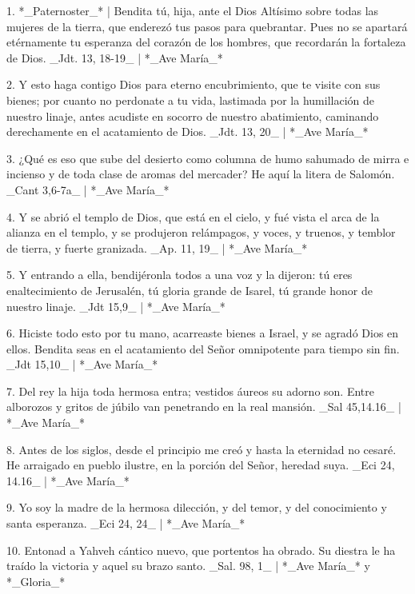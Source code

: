 1. *_Paternoster_* | Bendita tú, hija, ante el Dios Altísimo sobre todas las mujeres de la tierra, que enderezó tus pasos para quebrantar. Pues no se apartará etérnamente tu esperanza del corazón de los hombres, que recordarán la fortaleza de Dios. _Jdt. 13, 18-19_ | *_Ave María_*

2. Y esto haga contigo Dios para eterno encubrimiento, que te visite con sus bienes; por cuanto no perdonate a tu vida, lastimada por la humillación de nuestro linaje, antes acudiste en socorro de nuestro abatimiento, caminando derechamente en el acatamiento de Dios. _Jdt. 13, 20_ | *_Ave María_*

3. ¿Qué es eso que sube del desierto como columna de humo sahumado de mirra e incienso y de toda clase de aromas del mercader? He aquí la litera de Salomón. _Cant 3,6-7a_ | *_Ave María_*

4. Y se abrió el templo de Dios, que está en el cielo, y fué vista el arca de la alianza en el templo, y se produjeron relámpagos, y voces, y truenos, y temblor de tierra, y fuerte granizada. _Ap. 11, 19_ | *_Ave María_*

5. Y entrando a ella, bendijéronla todos a una voz y la dijeron: tú eres enaltecimiento de Jerusalén, tú gloria grande de Isarel, tú grande honor de nuestro linaje. _Jdt 15,9_ | *_Ave María_*

6. Hiciste todo esto por tu mano, acarreaste bienes a Israel, y se agradó Dios en ellos. Bendita seas en el acatamiento del Señor omnipotente para tiempo sin fin. _Jdt 15,10_ | *_Ave María_*

7. Del rey la hija toda hermosa entra; vestidos áureos su adorno son. Entre alborozos y gritos de júbilo van penetrando en la real mansión. _Sal 45,14.16_ | *_Ave María_*

8. Antes de los siglos, desde el principio me creó y hasta la eternidad no cesaré. He arraigado en pueblo ilustre, en la porción del Señor, heredad suya. _Eci 24, 14.16_ | *_Ave María_*

9. Yo soy la madre de la hermosa dilección, y del temor, y del conocimiento y santa esperanza. _Eci 24, 24_ | *_Ave María_*

10. Entonad a Yahveh cántico nuevo, que portentos ha obrado. Su diestra le ha traído la victoria y aquel su brazo santo. _Sal. 98, 1_ | *_Ave María_* y *_Gloria_*